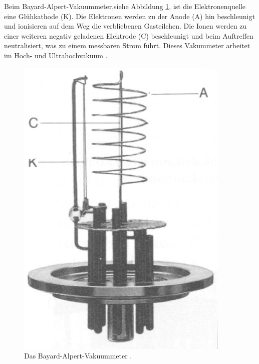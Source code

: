 Beim Bayard-Alpert-Vakuummeter,siehe Abbildung \ref{fig:bav}, ist die Elektronenquelle eine Glühkathode (K). Die Elektronen werden zu der Anode (A) hin beschleunigt und ionisieren auf dem Weg die verbliebenen Gasteilchen. Die Ionen werden zu einer weiteren negativ geladenen Elektrode (C) beschleunigt und beim Auftreffen neutralisiert, was zu einem messbaren Strom führt. Dieses Vakummeter arbeitet im Hoch- und Ultrahochvakuum \cite{Spektrum}.
\begin{figure}
\centering
\includegraphics[scale=0.3]{content/images/bav.jpg}
\caption{Das Bayard-Alpert-Vakuummeter \cite{Spektrum}.}
\label{fig:bav}
\end{figure}